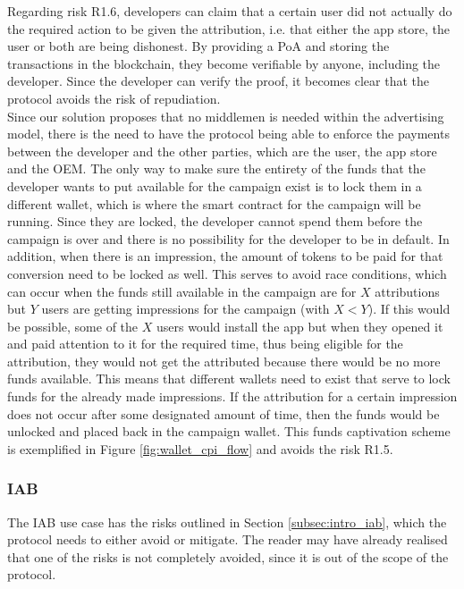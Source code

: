 Regarding risk \textsf{R1.6}, developers can claim that a certain user did not actually do the required action to be given the attribution, i.e. that either the app store, the user or both are being dishonest. By providing a \textsf{PoA} and storing the transactions in the blockchain, they become verifiable by anyone, including the developer. Since the developer can verify the proof, it becomes clear that the protocol avoids the risk of repudiation. \\

Since our solution proposes that no middlemen is needed within the advertising model, there is the need to have the protocol being able to enforce the payments between the developer and the other parties, which are the user, the app store and the OEM. The only way to make sure the entirety of the funds that the developer wants to put available for the campaign exist is to lock them in a different wallet, which is where the smart contract for the campaign will be running. Since they are locked, the developer cannot spend them before the campaign is over and there is no possibility for the developer to be in default. In addition, when there is an impression, the amount of tokens to be paid for that conversion need to be locked as well. This serves to avoid race conditions, which can occur when the funds still available in the campaign are for $X$ attributions but $Y$ users are getting impressions for the campaign (with $X < Y$). If this would be possible, some of the $X$ users would install the app but when they opened it and paid attention to it for the required time, thus being eligible for the attribution, they would not get the attributed because there would be no more funds available. This means that different wallets need to exist that serve to lock funds for the already made impressions. If the attribution for a certain impression does not occur after some designated amount of time, then the funds would be unlocked and placed back in the campaign wallet. This funds captivation scheme is exemplified in Figure \ref{fig:wallet_cpi_flow} and avoids the risk \textsf{R1.5}.

\subsubsection{IAB}

The IAB use case has the risks outlined in Section \ref{subsec:intro_iab}, which the protocol needs to either avoid or mitigate. The reader may have already realised that one of the risks is not completely avoided, since it is out of the scope of the protocol. \\

